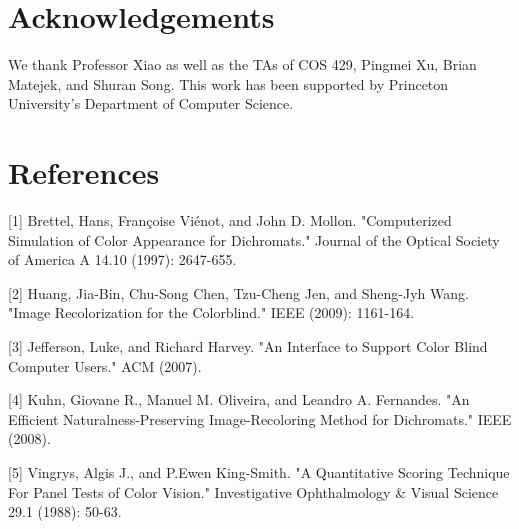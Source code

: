 \documentclass[10pt,twocolumn,letterpaper]{article}
\begin{document}
\section{Acknowledgements}

We thank Professor Xiao as well as the TAs of COS 429, Pingmei Xu, Brian Matejek, and Shuran Song. This work has been supported by Princeton University’s Department of Computer Science. 


\section{References}

{\small


[1] Brettel, Hans, Françoise Viénot, and John D. Mollon. "Computerized Simulation of Color 
Appearance for Dichromats." Journal of the Optical Society of America A 14.10 (1997): 2647-655. 

[2] Huang, Jia-Bin, Chu-Song Chen, Tzu-Cheng Jen, and Sheng-Jyh Wang. "Image Recolorization for the Colorblind." IEEE (2009): 1161-164. 

[3] Jefferson, Luke, and Richard Harvey. "An Interface to Support Color Blind Computer Users." ACM (2007).

[4] Kuhn, Giovane R., Manuel M. Oliveira, and Leandro A. Fernandes. "An Efficient Naturalness-Preserving Image-Recoloring Method for Dichromats." IEEE (2008).

[5] Vingrys, Algis J., and P.Ewen King-Smith. "A Quantitative Scoring Technique For Panel Tests of Color Vision." Investigative Ophthalmology \& Visual Science 29.1 (1988): 50-63. 

}
\end{document}
